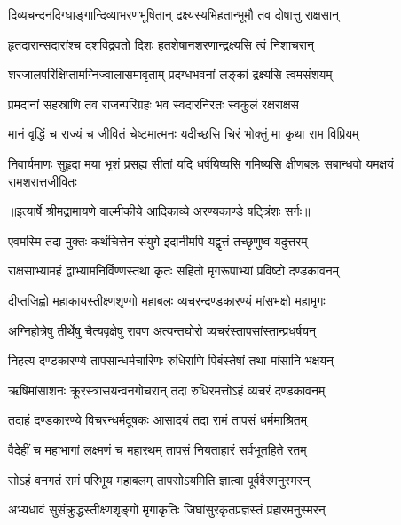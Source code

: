 \twolineshloka
{दिव्यचन्दनदिग्धाङ्गान्दिव्याभरणभूषितान्}
{द्रक्ष्यस्यभिहतान्भूमौ तव दोषात्तु राक्षसान्} %

\twolineshloka
{हृतदारान्सदारांश्च दशविद्रवतो दिशः}
{हतशेषानशरणान्द्रक्ष्यसि त्वं निशाचरान्} %

\twolineshloka
{शरजालपरिक्षिप्तामग्निज्वालासमावृताम्}
{प्रदग्धभवनां लङ्कां द्रक्ष्यसि त्वमसंशयम्} %

\twolineshloka
{प्रमदानां सहस्राणि तव राजन्परिग्रहः}
{भव स्वदारनिरतः स्वकुलं रक्षराक्षस} %

\twolineshloka
{मानं वृद्धिं च राज्यं च जीवितं चेष्टमात्मनः}
{यदीच्छसि चिरं भोक्तुं मा कृथा राम विप्रियम्} %

\fourlineindentedshloka
{निवार्यमाणः सुहृदा मया भृशं}
{ प्रसह्य सीतां यदि धर्षयिष्यसि}
{गमिष्यसि क्षीणबलः सबान्धवो}
{ यमक्षयं रामशरात्तजीवितः} %


{॥इत्यार्षे श्रीमद्रामायणे वाल्मीकीये आदिकाव्ये अरण्यकाण्डे षट्त्रिंशः सर्गः॥}


\twolineshloka
{एवमस्मि तदा मुक्तः कथंचित्तेन संयुगे}
{इदानीमपि यद्वृत्तं तच्छृणुष्व यदुत्तरम्} %

\twolineshloka
{राक्षसाभ्यामहं द्वाभ्यामनिर्विण्णस्तथा कृतः}
{सहितो मृगरूपाभ्यां प्रविष्टो दण्डकावनम्} %

\twolineshloka
{दीप्तजिह्वो महाकायस्तीक्ष्णशृण्गो महाबलः}
{व्यचरन्दण्डकारण्यं मांसभक्षो महामृगः} %

\twolineshloka
{अग्निहोत्रेषु तीर्थेषु चैत्यवृक्षेषु रावण}
{अत्यन्तघोरो व्यचरंस्तापसांस्तान्प्रधर्षयन्} %

\twolineshloka
{निहत्य दण्डकारण्ये तापसान्धर्मचारिणः}
{रुधिराणि पिबंस्तेषां तथा मांसानि भक्षयन्} %

\twolineshloka
{ऋषिमांसाशनः क्रूरस्त्रासयन्वनगोचरान्}
{तदा रुधिरमत्तोऽहं व्यचरं दण्डकावनम्} %

\twolineshloka
{तदाहं दण्डकारण्ये विचरन्धर्मदूषकः}
{आसादयं तदा रामं तापसं धर्ममाश्रितम्} %

\twolineshloka
{वैदेहीं च महाभागां लक्ष्मणं च महारथम्}
{तापसं नियताहारं सर्वभूतहिते रतम्} %

\twolineshloka
{सोऽहं वनगतं रामं परिभूय महाबलम्}
{तापसोऽयमिति ज्ञात्वा पूर्ववैरमनुस्मरन्} %

\twolineshloka
{अभ्यधावं सुसंक्रुद्धस्तीक्ष्णशृङ्गो मृगाकृतिः}
{जिघांसुरकृतप्रज्ञस्तं प्रहारमनुस्मरन्} %

